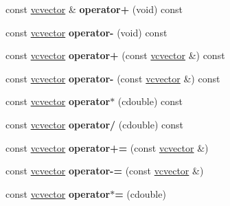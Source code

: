 \begin{DoxyCompactItemize}
\item 
const \hyperlink{classvcvector}{vcvector} \& {\bfseries operator+} (void) const \hypertarget{classvcvector_adb351a50712e665e1869c7ccbe10a269}{}\label{classvcvector_adb351a50712e665e1869c7ccbe10a269}

\item 
const \hyperlink{classvcvector}{vcvector} {\bfseries operator-\/} (void) const \hypertarget{classvcvector_a46f9471eeb2bf913ccbd1e3758d51229}{}\label{classvcvector_a46f9471eeb2bf913ccbd1e3758d51229}

\item 
const \hyperlink{classvcvector}{vcvector} {\bfseries operator+} (const \hyperlink{classvcvector}{vcvector} \&) const \hypertarget{classvcvector_a6f13e8e1ffabfaca607a50a8fe0225b0}{}\label{classvcvector_a6f13e8e1ffabfaca607a50a8fe0225b0}

\item 
const \hyperlink{classvcvector}{vcvector} {\bfseries operator-\/} (const \hyperlink{classvcvector}{vcvector} \&) const \hypertarget{classvcvector_a86d650a72a739e09df6ec2b72f8c74ff}{}\label{classvcvector_a86d650a72a739e09df6ec2b72f8c74ff}

\item 
const \hyperlink{classvcvector}{vcvector} {\bfseries operator$\ast$} (cdouble) const \hypertarget{classvcvector_ac61ba36ba186ba3df1f92dd7d7b61e88}{}\label{classvcvector_ac61ba36ba186ba3df1f92dd7d7b61e88}

\item 
const \hyperlink{classvcvector}{vcvector} {\bfseries operator/} (cdouble) const \hypertarget{classvcvector_a00d226ba49bec54b3e10c51667133801}{}\label{classvcvector_a00d226ba49bec54b3e10c51667133801}

\item 
const \hyperlink{classvcvector}{vcvector} {\bfseries operator+=} (const \hyperlink{classvcvector}{vcvector} \&)\hypertarget{classvcvector_ae8d6e072b26735f8d11bc837cc6d4e22}{}\label{classvcvector_ae8d6e072b26735f8d11bc837cc6d4e22}

\item 
const \hyperlink{classvcvector}{vcvector} {\bfseries operator-\/=} (const \hyperlink{classvcvector}{vcvector} \&)\hypertarget{classvcvector_a074736a8e2f82b7687e0cfef86c9cff3}{}\label{classvcvector_a074736a8e2f82b7687e0cfef86c9cff3}

\item 
const \hyperlink{classvcvector}{vcvector} {\bfseries operator$\ast$=} (cdouble)\hypertarget{classvcvector_a9ebf57d56dd202b3dd19cd11693fb7b3}{}\label{classvcvector_a9ebf57d56dd202b3dd19cd11693fb7b3}


\end{DoxyCompactItemize}
